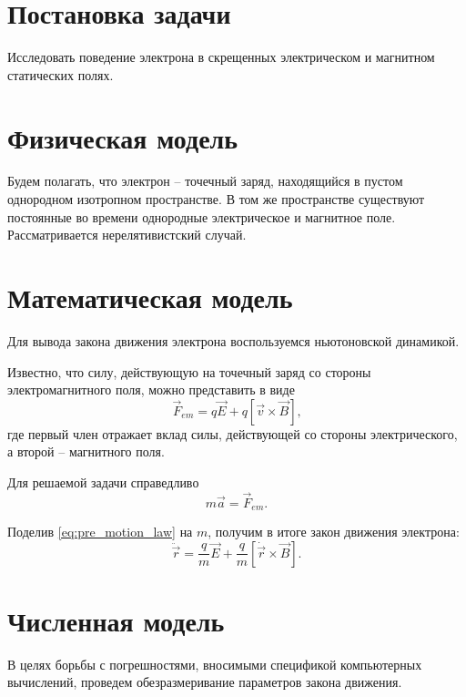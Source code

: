 \documentclass[12pt,a4paper]{article}
\begin{document}
\section{Постановка задачи}

Исследовать поведение электрона в скрещенных электрическом и магнитном статических полях.

\section{Физическая модель}

Будем полагать, что электрон -- точечный заряд, находящийся в пустом однородном изотропном пространстве. В том же пространстве существуют постоянные во времени однородные электрическое и магнитное поле. Рассматривается нерелятивистский случай.

\section{Математическая модель}

Для вывода закона движения электрона воспользуемся ньютоновской динамикой.

Известно, что силу, действующую на точечный заряд со стороны электромагнитного поля, можно представить в виде
\begin{equation}
\vec{F}_{em} = q \vec{E} + q \left[\vec{v} \times \vec{B}\right] \textrm{,}
\end{equation}
где первый член отражает вклад силы, действующей со стороны электрического, а второй -- магнитного поля.

Для решаемой задачи справедливо
\begin{equation} \label{eq:pre_motion_law}
m \vec{a} = \vec{F}_{em} \textrm{.}
\end{equation}

Поделив \autoref{eq:pre_motion_law} на $m$, получим в итоге закон движения электрона:
\begin{equation} \label{eq:motion_law}
\ddot{\vec{r}} = \frac{q}{m} \vec{E} + \frac{q}{m} \left[\dot{\vec{r}} \times \vec{B}\right] \textrm{.}
\end{equation}

\section{Численная модель}

В целях борьбы с погрешностями, вносимыми спецификой компьютерных вычислений, проведем обезразмеривание параметров закона движения.
\end{document}
